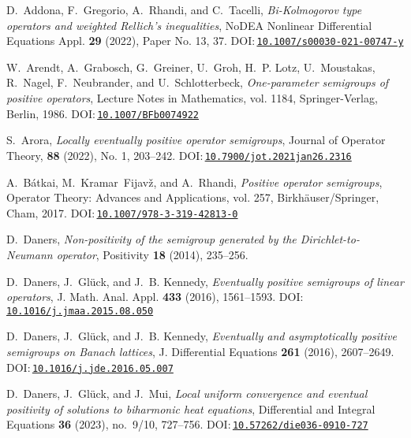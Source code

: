 \documentclass{baustms}
\theoremstyle{cupthm}
\theoremstyle{cupdefn}
\theoremstyle{cuprem}
\numberwithin{equation}{section}
\begin{document}
\begin{thebibliography}{99}
D.~Addona, F.~Gregorio, A.~Rhandi, and C.~Tacelli, \emph{Bi-Kolmogorov type
	operators and weighted Rellich's inequalities}, NoDEA Nonlinear
Differential Equations Appl. \textbf{29} (2022), Paper No. 13, 37.
DOI:\,\href{https://doi.org/10.1007/s00030-021-00747-y}{\nolinkurl{10.1007/s00030-021-00747-y}}

W.~Arendt, A.~Grabosch, G.~Greiner, U.~Groh, H.~P. Lotz, U.~Moustakas,
R.~Nagel, F.~Neubrander, and U.~Schlotterbeck, \emph{One-parameter semigroups
	of positive operators}, Lecture Notes in Mathematics, vol. 1184,
Springer-Verlag, Berlin, 1986.
DOI:\,\href{https://doi.org/10.1007/BFb0074922}{\nolinkurl{10.1007/BFb0074922}}

S.~Arora, \emph{Locally eventually positive operator semigroups}, Journal of Operator Theory, \textbf{88} (2022), No. 1, 203--242.
DOI:\,\href{http://dx.doi.org/10.7900/jot.2021jan26.2316}{\nolinkurl{10.7900/jot.2021jan26.2316}}

A.~B\'{a}tkai, M.~Kramar~Fijav\v{z}, and A.~Rhandi, \emph{Positive operator
	semigroups}, Operator Theory: Advances and Applications, vol. 257,
Birkh\"{a}user/Springer, Cham, 2017.
DOI:\,\href{https://doi.org/10.1007/978-3-319-42813-0}{\nolinkurl{10.1007/978-3-319-42813-0}}

D.~Daners, \emph{Non-positivity of the semigroup generated by the
	{D}irichlet-to-{N}eumann operator}, Positivity \textbf{18} (2014), 235--256.

D.~Daners, J.~Gl\"{u}ck, and J.~B. Kennedy, \emph{Eventually positive
	semigroups of linear operators}, J. Math. Anal. Appl. \textbf{433} (2016),
1561--1593.
DOI:\,\href{https://doi.org/10.1016/j.jmaa.2015.08.050}{\nolinkurl{10.1016/j.jmaa.2015.08.050}}

D.~Daners, J.~Gl\"{u}ck, and J.~B. Kennedy, \emph{Eventually and asymptotically
	positive semigroups on {B}anach lattices}, J. Differential Equations
\textbf{261} (2016), 2607--2649.
DOI:\,\href{https://doi.org/10.1016/j.jde.2016.05.007}{\nolinkurl{10.1016/j.jde.2016.05.007}}

D.~Daners, J.~Gl\"{u}ck, and J.~Mui, \emph{Local uniform convergence and eventual positivity of solutions to biharmonic heat equations},
Differential and Integral Equations \textbf{36} (2023), no.~9/10, 727--756.
DOI:\,\href{https://doi.org/10.57262/die036-0910-727}{\nolinkurl{10.57262/die036-0910-727}}


\end{thebibliography}
\end{document}
